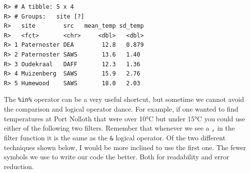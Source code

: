 \documentclass[]{book}
\newenvironment{Shaded}{\begin{snugshade}}{\end{snugshade}}
\newcommand{\KeywordTok}[1]{\textcolor[rgb]{0.13,0.29,0.53}{\textbf{#1}}}
\newcommand{\DataTypeTok}[1]{\textcolor[rgb]{0.13,0.29,0.53}{#1}}
\newcommand{\DecValTok}[1]{\textcolor[rgb]{0.00,0.00,0.81}{#1}}
\newcommand{\StringTok}[1]{\textcolor[rgb]{0.31,0.60,0.02}{#1}}
\newcommand{\CommentTok}[1]{\textcolor[rgb]{0.56,0.35,0.01}{\textit{#1}}}
\newcommand{\OtherTok}[1]{\textcolor[rgb]{0.56,0.35,0.01}{#1}}
\newcommand{\OperatorTok}[1]{\textcolor[rgb]{0.81,0.36,0.00}{\textbf{#1}}}
\newcommand{\NormalTok}[1]{#1}
\theoremstyle{definition}
\theoremstyle{definition}
\theoremstyle{definition}
\theoremstyle{remark}
\begin{document}
\begin{Shaded}
\end{Shaded}

\begin{verbatim}
R> # A tibble: 5 x 4
R> # Groups:   site [?]
R>   site        src   mean_temp sd_temp
R>   <fct>       <chr>     <dbl>   <dbl>
R> 1 Paternoster DEA        12.8   0.879
R> 2 Paternoster SAWS       13.6   1.40 
R> 3 Oudekraal   DAFF       12.3   1.36 
R> 4 Muizenberg  SAWS       15.9   2.76 
R> 5 Humewood    SAWS       18.0   2.03
\end{verbatim}

The \texttt{\%in\%} operator can be a very useful shortcut, but sometime
we cannot avoid the comparison and logical operator dance. For example,
if one wanted to find temperatures at Port Nolloth that were over 10°C
but under 15°C you could use either of the following two filters.
Remember that whenever we see a \texttt{,} in the filter function it is
the same as the \texttt{\&} logical operator. Of the two different
techniques shown below, I would be more inclined to use the first one.
The fewer symbols we use to write our code the better. Both for
readability and error reduction.

\begin{Shaded}
\end{Shaded}
\end{document}
